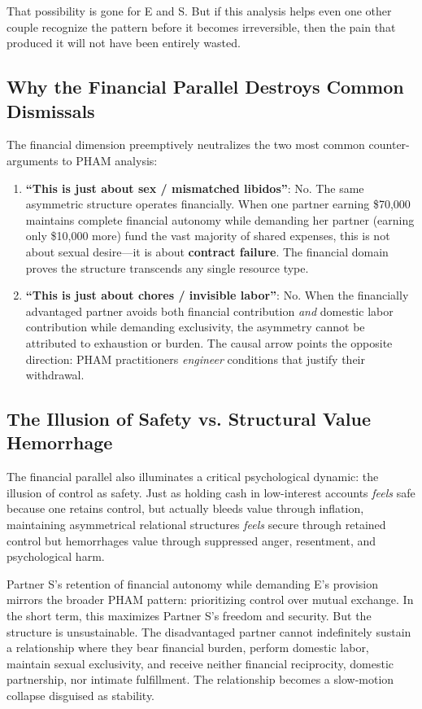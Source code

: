 \documentclass[12pt,openany]{book}
\numberwithin{equation}{chapter}
\begin{document}
That possibility is gone for E and S. But if this analysis helps even one other couple recognize the pattern before it becomes irreversible, then the pain that produced it will not have been entirely wasted.

\subsection{Why the Financial Parallel Destroys Common Dismissals}

The financial dimension preemptively neutralizes the two most common counter-arguments to PHAM analysis:

\begin{enumerate}
    \item \textbf{``This is just about sex / mismatched libidos''}: No. The same asymmetric structure operates financially. When one partner earning \$70,000 maintains complete financial autonomy while demanding her partner (earning only \$10,000 more) fund the vast majority of shared expenses, this is not about sexual desire---it is about \textbf{contract failure}. The financial domain proves the structure transcends any single resource type.
    
    \item \textbf{``This is just about chores / invisible labor''}: No. When the financially advantaged partner avoids both financial contribution \textit{and} domestic labor contribution while demanding exclusivity, the asymmetry cannot be attributed to exhaustion or burden. The causal arrow points the opposite direction: PHAM practitioners \textit{engineer} conditions that justify their withdrawal.
\end{enumerate}

\subsection{The Illusion of Safety vs. Structural Value Hemorrhage}

The financial parallel also illuminates a critical psychological dynamic: the illusion of control as safety. Just as holding cash in low-interest accounts \textit{feels} safe because one retains control, but actually bleeds value through inflation, maintaining asymmetrical relational structures \textit{feels} secure through retained control but hemorrhages value through suppressed anger, resentment, and psychological harm.

Partner S's retention of financial autonomy while demanding E's provision mirrors the broader PHAM pattern: prioritizing control over mutual exchange. In the short term, this maximizes Partner S's freedom and security. But the structure is unsustainable. The disadvantaged partner cannot indefinitely sustain a relationship where they bear financial burden, perform domestic labor, maintain sexual exclusivity, and receive neither financial reciprocity, domestic partnership, nor intimate fulfillment. The relationship becomes a slow-motion collapse disguised as stability.
\end{document}
